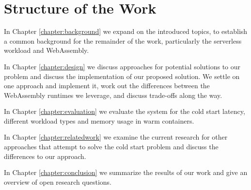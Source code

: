 \section{Structure of the Work}

In Chapter \ref{chapter:background} we expand on the introduced topics, to establish a common background for the remainder of the work, particularly the serverless workload and WebAssembly.

In Chapter \ref{chapter:design} we discuss approaches for potential solutions to our problem and discuss the implementation of our proposed solution. We settle on one approach and implement it, work out the differences between the WebAssembly runtimes we leverage, and discuss trade-offs along the way.

In Chapter \ref{chapter:evaluation} we evaluate the system for the cold start latency, different workload types and memory usage in warm containers.

In Chapter \ref{chapter:relatedwork} we examine the current research for other approaches that attempt to solve the cold start problem and discuss the differences to our approach. 

In Chapter \ref{chapter:conclusion} we summarize the results of our work and give an overview of open research questions.